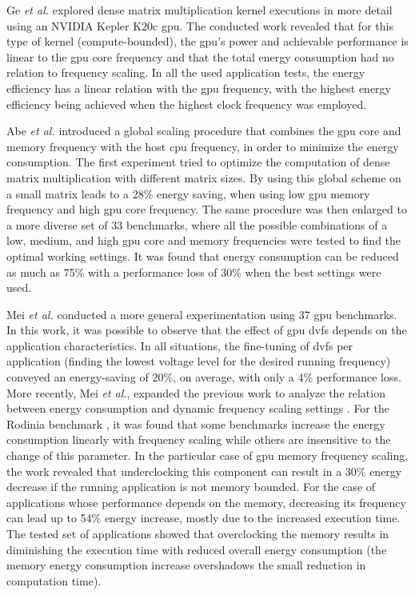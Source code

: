 Ge \textit{et al.} \cite{ge_effects_2013} explored dense matrix multiplication kernel executions in more detail using an NVIDIA Kepler K20c \acrshort{gpu}.  The conducted work revealed that for this type of kernel (compute-bounded), the \acrshort{gpu}'s power and achievable performance is linear to the \acrshort{gpu} core frequency and that the total energy consumption had no relation to frequency scaling. In all the used application tests, the energy efficiency has a linear relation with the \acrshort{gpu} frequency, with the highest energy efficiency being achieved when the highest clock frequency was employed.

Abe \textit{et al.} \cite{abe_power_2012} introduced a global scaling procedure that combines the \acrshort{gpu} core and memory frequency with the host \acrshort{cpu} frequency, in order to minimize the energy consumption. The first experiment tried to optimize the computation of dense matrix multiplication with different matrix sizes. By using this global scheme on a small matrix leads to a 28\% energy saving, when using low \acrshort{gpu} memory frequency and high \acrshort{gpu} core frequency. The same procedure was then enlarged to a more diverse set of 33 benchmarks, where all the possible combinations of a low, medium, and high \acrshort{gpu} core and memory frequencies were tested to find the optimal working settings. It was found that energy consumption can be reduced as much as 75\% with a performance loss of 30\% when the best settings were used. 

Mei \textit{et al.} \cite{mei_measurement_2013} conducted a more general experimentation using 37 \acrshort{gpu} benchmarks. In this work, it was possible to observe that the effect of \acrshort{gpu} \acrshort{dvfs} depends on the application characteristics. In all situations, the fine-tuning of \acrshort{dvfs} per application (finding the lowest voltage level for the desired running frequency) conveyed an energy-saving of 20\%, on average, with only a 4\% performance loss. More recently, Mei  \textit{et al.}, expanded the previous work to analyze the relation between energy consumption and dynamic frequency scaling settings \cite{mei_survey_2016}. For the  Rodinia benchmark \cite{che_rodinia:_2009}, it was found that some benchmarks increase the energy consumption linearly with frequency scaling while others are insensitive to the change of this parameter. In the particular case of \acrshort{gpu} memory frequency scaling, the work revealed that underclocking this component can result in a 30\% energy decrease if the running application is not memory bounded. For the case of applications whose performance depends on the memory, decreasing its frequency can lead up to 54\% energy increase, mostly due to the increased execution time. The tested set of applications showed that overclocking the memory results in diminishing the execution time with reduced overall energy consumption (the memory energy consumption increase overshadows the small reduction in computation time). 


